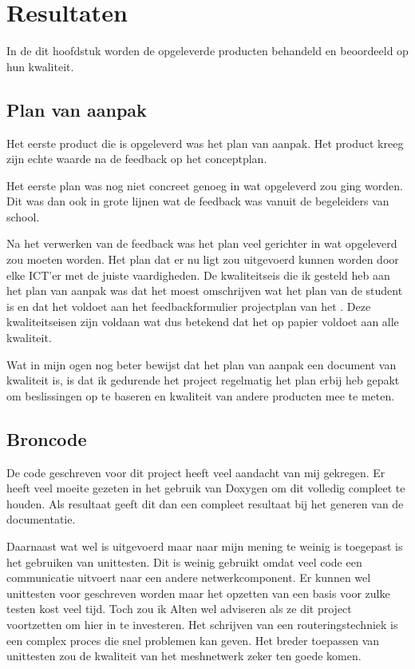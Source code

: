\documentclass[a4paper, 11pt, oneside]{report}
\begin{document}
\chapter{Resultaten}\label{sec:resultaten}

In de dit hoofdstuk worden de opgeleverde producten behandeld en beoordeeld op hun kwaliteit.

\section{Plan van aanpak}\label{sec:plan-van-aanpak}
Het eerste product die is opgeleverd was het plan van aanpak.
Het product kreeg zijn echte waarde na de feedback op het conceptplan.

Het eerste plan was nog niet concreet genoeg in wat opgeleverd zou ging worden. 
Dit was dan ook in grote lijnen wat de feedback was vanuit de begeleiders van school.

Na het verwerken van de feedback was het plan veel gerichter in wat opgeleverd zou moeten worden.
Het plan dat er nu ligt zou uitgevoerd kunnen worden door elke ICT'er met de juiste vaardigheden.
De kwaliteitseis die ik gesteld heb aan het plan van aanpak was dat het moest omschrijven wat het plan van de student is en dat het voldoet aan het feedbackformulier projectplan van het \citeauthor{HANfeed} \citeyear{HANfeed}. Deze kwaliteitseisen zijn voldaan wat dus betekend dat het op papier voldoet aan alle kwaliteit.

Wat in mijn ogen nog beter bewijst dat het plan van aanpak een document van kwaliteit is, is dat ik gedurende het project regelmatig het plan erbij heb gepakt om beslissingen op te baseren en kwaliteit van andere producten mee te meten.

\section{Broncode}\label{sec:broncode}
De code geschreven voor dit project heeft veel aandacht van mij gekregen. 
Er heeft veel moeite gezeten in het gebruik van Doxygen om dit volledig compleet te houden.
Als resultaat geeft dit dan een compleet resultaat bij het generen van de documentatie. 

Daarnaast wat wel is uitgevoerd maar naar mijn mening te weinig is toegepast is het gebruiken van unittesten.
Dit is weinig gebruikt omdat veel code een communicatie uitvoert naar een andere netwerkcomponent.
Er kunnen wel unittesten voor geschreven worden maar het opzetten van een basis voor zulke testen kost veel tijd.
Toch zou ik Alten wel adviseren als ze dit project voortzetten om hier in te investeren.
Het schrijven van een routeringstechniek is een complex proces die snel problemen kan geven.
Het breder toepassen van unittesten zou de kwaliteit van het meshnetwerk zeker ten goede komen. 
\end{document}
